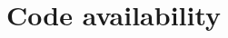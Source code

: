 \documentclass[fleqn,10pt]{wlscirep}
\begin{document}


\section*{Code availability}




\end{document}

